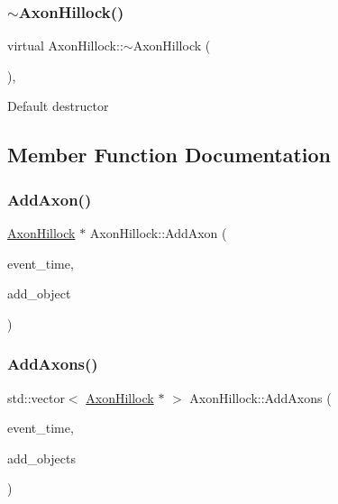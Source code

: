 \mbox{\label{classAxonHillock_ae86220026d7c87edc1c514521d66f992}} 
\subsubsection{\texorpdfstring{$\sim$\+Axon\+Hillock()}{~AxonHillock()}}
{\footnotesize\ttfamily virtual Axon\+Hillock\+::$\sim$\+Axon\+Hillock (\begin{DoxyParamCaption}{ }\end{DoxyParamCaption})\hspace{0.3cm}{\ttfamily [inline]}, {\ttfamily [virtual]}}

Default destructor 

\subsection{Member Function Documentation}
\mbox{\label{classAxonHillock_a02bfbaea9ea7a160933f8500c8b41d6a}} 
\subsubsection{\texorpdfstring{Add\+Axon()}{AddAxon()}}
{\footnotesize\ttfamily \mbox{\hyperlink{classAxonHillock}{Axon\+Hillock}} $\ast$ Axon\+Hillock\+::\+Add\+Axon (\begin{DoxyParamCaption}\item[{std\+::chrono\+::time\+\_\+point$<$ \mbox{\hyperlink{universe_8h_a0ef8d951d1ca5ab3cfaf7ab4c7a6fd80}{Clock}} $>$}]{event\+\_\+time,  }\item[{\mbox{\hyperlink{classAxonHillock}{Axon\+Hillock}} $\ast$}]{add\+\_\+object }\end{DoxyParamCaption})}

\mbox{\label{classAxonHillock_a54a82227b96757f1c0d7450df6a3df37}} 
\subsubsection{\texorpdfstring{Add\+Axons()}{AddAxons()}}
{\footnotesize\ttfamily std\+::vector$<$ \mbox{\hyperlink{classAxonHillock}{Axon\+Hillock}} $\ast$ $>$ Axon\+Hillock\+::\+Add\+Axons (\begin{DoxyParamCaption}\item[{std\+::chrono\+::time\+\_\+point$<$ \mbox{\hyperlink{universe_8h_a0ef8d951d1ca5ab3cfaf7ab4c7a6fd80}{Clock}} $>$}]{event\+\_\+time,  }\item[{std\+::vector$<$ \mbox{\hyperlink{classAxonHillock}{Axon\+Hillock}} $\ast$$>$}]{add\+\_\+objects }\end{DoxyParamCaption})}

